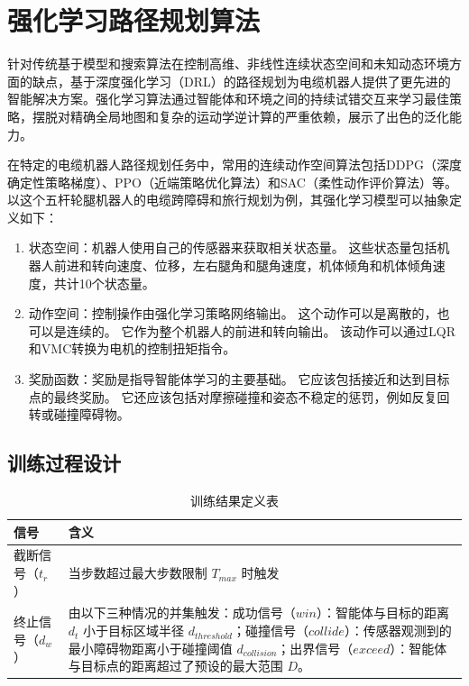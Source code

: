\section{强化学习路径规划算法}

针对传统基于模型和搜索算法在控制高维、非线性连续状态空间和未知动态环境方面的缺点，基于深度强化学习（DRL）的路径规划为电缆机器人提供了更先进的智能解决方案\cite{tai2016deep}。强化学习算法通过智能体和环境之间的持续试错交互来学习最佳策略，摆脱对精确全局地图和复杂的运动学逆计算的严重依赖，展示了出色的泛化能力。

在特定的电缆机器人路径规划任务中，常用的连续动作空间算法包括DDPG（深度确定性策略梯度）、PPO（近端策略优化算法）和SAC（柔性动作评价算法）等。以这个五杆轮腿机器人的电缆跨障碍和旅行规划为例，其强化学习模型可以抽象定义如下：
\begin{enumerate}

\item 状态空间：机器人使用自己的传感器来获取相关状态量。 这些状态量包括机器人前进和转向速度、位移，左右腿角和腿角速度，机体倾角和机体倾角速度，共计10个状态量。

\item 动作空间：控制操作由强化学习策略网络输出。 这个动作可以是离散的，也可以是连续的。 它作为整个机器人的前进和转向输出。 该动作可以通过LQR和VMC转换为电机的控制扭矩指令。

\item 奖励函数：奖励是指导智能体学习的主要基础。 它应该包括接近和达到目标点的最终奖励。 它还应该包括对摩擦碰撞和姿态不稳定的惩罚，例如反复回转或碰撞障碍物。
\end{enumerate}

\subsection{训练过程设计}

\begin{table}[!htbp]
  \centering
  \caption{训练结果定义表}\label{tab:training_definition}
  \renewcommand{\arraystretch}{1.3}
    \begin{tabular}{lp{}}
    \toprule
    \textbf{信号} & \textbf{含义}  \\
    \midrule
    截断信号（$t_r$）& 当步数超过最大步数限制 $T_{max}$ 时触发  \\
        终止信号（$d_w$）& 由以下三种情况的并集触发：成功信号（$win$）：智能体与目标的距离 $d_t$ 小于目标区域半径 $d_{threshold}$；碰撞信号（$collide$）：传感器观测到的最小障碍物距离小于碰撞阈值 $d_{collision}$；出界信号（$exceed$）：智能体与目标点的距离超过了预设的最大范围 $D$。\\
    \bottomrule
  \end{tabular}
\end{table}
\raggedbottom

